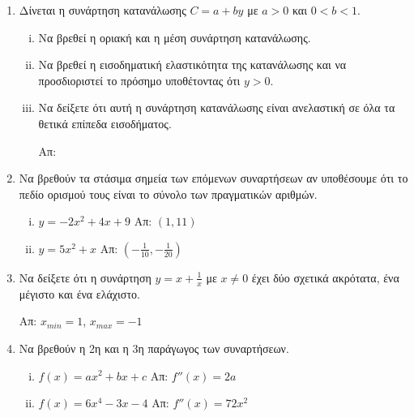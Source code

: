\begin{enumerate}
    \item Δίνεται η συνάρτηση κατανάλωσης $ C=a+by $ με $ a>0 $ και $ 0<b<1 $.

        \begin{enumerate}[i)]
            \item Να βρεθεί η οριακή και η μέση συνάρτηση κατανάλωσης. 
            \item Να βρεθεί η εισοδηματική ελαστικότητα της κατανάλωσης και να προσδιοριστεί το
                πρόσημο υποθέτοντας ότι $ y>0 $. 
            \item Να δείξετε ότι αυτή η συνάρτηση κατανάλωσης είναι ανελαστική σε όλα τα θετικά
επίπεδα εισοδήματος. 

\hfill Απ:  
        \end{enumerate}

    \item Να βρεθούν τα στάσιμα σημεία των επόμενων συναρτήσεων αν υποθέσουμε ότι το πεδίο ορισμού
        τους είναι το σύνολο των πραγματικών αριθμών.

        \begin{enumerate}[i)]
            \item $ y = -2x^{2}+4x+9 $ \hfill Απ: $ (1,11) $
            \item $ y = 5x^{2}+x $ \hfill Απ: $ \left(- \frac{1}{10}, - \frac{1}{20}\right) $ 
        \end{enumerate}

    \item Να δείξετε ότι η συνάρτηση $ y = x + \frac{1}{x} $ με $ x \neq 0 $ έχει δύο σχετικά
        ακρότατα, ένα μέγιστο και ένα ελάχιστο. 

        \hfill Απ: $ x_{min} = 1$, $ x_{max}=-1  $ 

    \item Να βρεθούν η 2η και η 3η παράγωγος των συναρτήσεων.

        \begin{enumerate}[i)]
            \item $ f(x) = ax^{2}+bx+c $ \hfill Απ: $ f''(x)=2a $
            \item $ f(x) = 6x^{4}-3x-4 $ \hfill Απ: $ f''(x) = 72x^{2} $ 
        \end{enumerate}


\end{enumerate}
